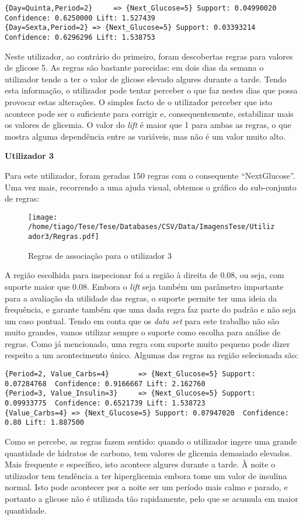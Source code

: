 \begin{lstlisting}
{Day=Quinta,Period=2}     => {Next_Glucose=5} Support: 0.04990020 Confidence: 0.6250000 Lift: 1.527439
{Day=Sexta,Period=2} => {Next_Glucose=5} Support: 0.03393214  Confidence: 0.6296296 Lift: 1.538753

\end{lstlisting}   
Neste utilizador, ao contrário do primeiro, foram descobertas regras para valores de glicose 5. As regras são bastante parecidas: em dois dias da semana o utilizador tende a ter o valor de glicose elevado algures durante a tarde. Tendo esta informação, o utilizador pode tentar perceber o que faz nestes dias que possa provocar estas alterações. O simples facto de o utilizador perceber que isto acontece pode ser o suficiente para corrigir e, consequentemente, estabilizar mais os valores de glicemia. O valor do \textit{lift} é maior que 1 para ambas as regras, o que mostra alguma dependência entre as variáveis, mas não é um valor muito alto.


\textbf{Utilizador 3}

Para este utilizador, foram geradas 150 regras com o consequente ``Next\textunderscore Glucose''. Uma vez mais, recorrendo a uma ajuda visual, obtemos o gráfico do sub-conjunto de regras:


\begin{figure}[H]
\centering
\texttt{[image: /home/tiago/Tese/Tese/Databases/CSV/Data/ImagensTese/Utilizador3/Regras.pdf]}
\caption{Regras de associação para o utilizador 3}
\end{figure}
A região escolhida para inspecionar foi a região à direita de 0.08, ou seja, com suporte maior que 0.08. Embora o \textit{lift} seja também um parâmetro importante para a avaliação da utilidade das regras, o suporte permite ter uma ideia da frequência, e garante também que uma dada regra faz parte do padrão e não seja um caso pontual. Tendo em conta que os \textit{data set} para este trabalho não são muito grandes, vamos utilizar sempre o suporte como escolha para análise de regras. Como já mencionado, uma regra com suporte muito pequeno pode dizer respeito a um acontecimento único. Algumas das regras na região selecionada são:

\begin{lstlisting}
{Period=2, Value_Carbs=4}       => {Next_Glucose=5} Support: 0.07284768  Confidence: 0.9166667 Lift: 2.162760
{Period=3, Value_Insulin=3}     => {Next_Glucose=5} Support: 0.09933775  Confidence: 0.6521739 Lift: 1.538723
{Value_Carbs=4} => {Next_Glucose=5} Support: 0.07947020  Confidence: 0.80 Lift: 1.887500
\end{lstlisting}
Como se percebe, as regras fazem sentido: quando o utilizador ingere uma grande quantidade de hidratos de carbono, tem valores de glicemia demasiado elevados. Mais frequente e específico, isto acontece algures durante a tarde. À noite o utilizador tem tendência a ter hiperglicemia embora tome um valor de insulina normal. Isto pode acontecer por a noite ser um período mais calmo e parado, e portanto a glicose não é utilizada tão rapidamente, pelo que se acumula em maior quantidade. 


